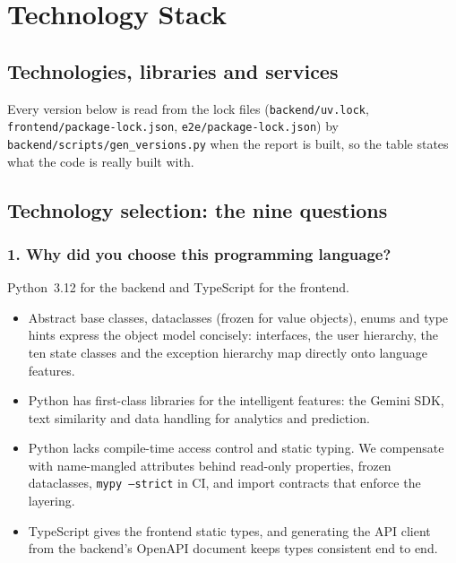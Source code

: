 \chapter{Technology Stack}\label{ch:technology}

\section{Technologies, libraries and services}
Every version below is read from the lock files (\texttt{backend/uv.lock},
\texttt{frontend/package-lock.json}, \texttt{e2e/package-lock.json}) by
\texttt{backend/scripts/gen\_versions.py} when the report is built, so the table states what
the code is really built with.



\section{Technology selection: the nine questions}

\subsection*{1. Why did you choose this programming language?}
Python~3.12 for the backend and TypeScript for the frontend.
\begin{itemize}
  \item Abstract base classes, dataclasses (frozen for value objects), enums and type hints
    express the object model concisely: interfaces, the user hierarchy, the ten state classes
    and the exception hierarchy map directly onto language features.
  \item Python has first-class libraries for the intelligent features: the Gemini SDK,
    text similarity and data handling for analytics and prediction.
  \item Python lacks compile-time access control and static typing. We compensate with
    name-mangled attributes behind read-only properties, frozen dataclasses, \texttt{mypy
    --strict} in CI, and import contracts that enforce the layering.
  \item TypeScript gives the frontend static types, and generating the API client from the
    backend's OpenAPI document keeps types consistent end to end.
\end{itemize}

